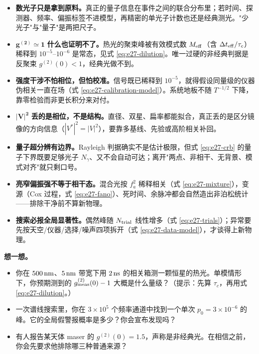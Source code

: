\begin{itemize}
  \item \textbf{数光子只是拿到原料。}真正的量子信息在事件之间的联合分布里；若时间、探测器、频率、偏振标签不进模型，再精密的单光子计数也还是经典测光。"少光子"与"量子"是两把尺子。
  \item \(\mathbf{g^{(2)}\simeq1}\)\textbf{ 什么也证明不了。}热光的聚束峰被有效模式数 \(M_{\rm eff}\)（含 \(\Delta t_{\rm eff}/\tau_c\)）稀释到 \(10^{-5}\)--\(10^{-6}\) 是常态，见式 \eqref{eq:e27-dilution}。唯一过硬的非经典判据是反聚束 \(g^{(2)}(0)<1\)，经典光做不到。
  \item \textbf{强度干涉不怕相位，但怕校准。}信号既已稀释到 \(10^{-5}\)，就得假设同量级的仪器伪相关一直在场（式 \eqref{eq:e27-calibration-model}）。系统地板不随 \(T^{-1/2}\) 下降，靠零检验而非更长积分来对付。
  \item \(\mathbf{|V|^2}\)\textbf{ 丢的是相位，不是结构。}直径、双星、扁率都能拟合，真正丢的是区分镜像的方向信息（\(|V^\ast|^2=|V|^2\)），要靠多基线、先验或高阶相关补回。
  \item \textbf{量子超分辨有边界。}Rayleigh 判据确实不是估计极限，但式 \eqref{eq:e27-crb} 的量子下界既要足够光子 \(N_\gamma\)、又不会自动可达；离开"两点、非相干、无背景、模式对齐"就只剩口号。
  \item \textbf{亮窄偏振强不等于相干态。}混合光按 \(f_a^2\) 稀释相关（式 \eqref{eq:e27-mixture}），变源（Cox 过程，式 \eqref{eq:e27-fano}）、死时间、余脉冲都会自然造出非泊松统计——排除干净前不算新物理。
  \item \textbf{搜索必报全局显著性。}偶然峰随 \(N_{\rm trial}\) 线性增多（式 \eqref{eq:e27-trials}）；异常要先按天空/仪器/选择/噪声四项拆开（式 \eqref{eq:e27-data-model}），才谈得上新物理。
\end{itemize}

\medskip
\noindent\textbf{想一想。}
\begin{itemize}
  \item 你在 \(500\,{\rm nm}\)、\(5\,{\rm nm}\) 带宽下用 \(2\,{\rm ns}\) 的相关箱测一颗恒星的热光。单模情形下，你预期测到的 \(g^{(2)}_{\rm meas}(0)-1\) 大概是什么量级？（提示：先算 \(\tau_c\)，再用式 \eqref{eq:e27-dilution}。）
  \item 一次谱线搜索里，你在 \(3\times10^{5}\) 个频率通道中找到一个单次 \(p_0=3\times10^{-6}\) 的峰。它的全局假警报概率是多少？你会宣布发现吗？
  \item 有人报告某天体 maser 的 \(g^{(2)}(0)=1.5\)，声称是非经典光。在相信之前，你会先要求他排除哪三种普通来源？
\end{itemize}
